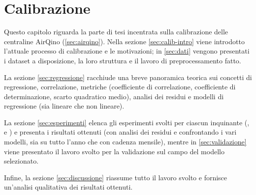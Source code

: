 \chapter{Calibrazione}\label{ch:calibrazione}
Questo capitolo riguarda la parte di tesi incentrata sulla calibrazione delle centraline AirQino (\ref{sec:airqino}). Nella sezione \ref{sec:calib-intro} viene introdotto l'attuale processo di calibrazione e le motivazioni; in \ref{sec:dati} vengono presentati i dataset a disposizione, la loro struttura e il lavoro di preprocessamento fatto.

La sezione \ref{sec:regressione} racchiude una breve panoramica teorica sui concetti di regressione, correlazione, metriche (coefficiente di correlazione, coefficiente di determinazione, scarto quadratico medio), analisi dei residui e modelli di regressione (sia lineare che non lineare).

La sezione \ref{sec:esperimenti} elenca gli esperimenti svolti per ciascun inquinante (,  e ) e presenta i risultati ottenuti (con analisi dei residui e confrontando i vari modelli, sia su tutto l'anno che con cadenza mensile), mentre in \ref{sec:validazione} viene presentato il lavoro svolto per la validazione sul campo del modello selezionato.

Infine, la sezione \ref{sec:discussione} riassume tutto il lavoro svolto e fornisce un'analisi qualitativa dei risultati ottenuti.

\clearpage
